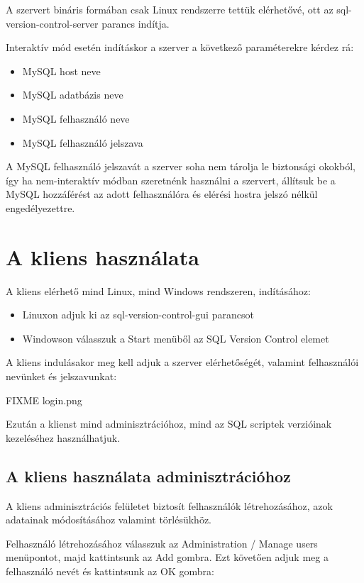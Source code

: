 \documentclass[a4paper,12pt]{article}
\begin{document}
A szervert bináris formában csak Linux rendszerre tettük elérhetővé, ott az
sql-version-control-server parancs indítja.

Interaktív mód esetén indításkor a szerver a következő paraméterekre kérdez rá:

\begin{itemize}
\item MySQL host neve
\item MySQL adatbázis neve
\item MySQL felhasználó neve
\item MySQL felhasználó jelszava
\end{itemize}

A MySQL felhasználó jelszavát a szerver soha nem tárolja le biztonsági okokból,
így ha nem-interaktív módban szeretnénk használni a szervert, állítsuk be a
MySQL hozzáférést az adott felhasználóra és elérési hostra jelszó nélkül
engedélyezettre.

\section{A kliens használata}

A kliens elérhető mind Linux, mind Windows rendszeren, indításához:

\begin{itemize}
\item Linuxon adjuk ki az sql-version-control-gui parancsot
\item Windowson válasszuk a Start menüből az SQL Version Control elemet
\end{itemize}

A kliens indulásakor meg kell adjuk a szerver elérhetőségét, valamint
felhasználói nevünket és jelszavunkat:

FIXME login.png

Ezután a klienst mind adminisztrációhoz, mind az SQL scriptek verzióinak
kezeléséhez használhatjuk.

\subsection{A kliens használata adminisztrációhoz}

A kliens adminisztrációs felületet biztosít felhasználók létrehozásához, azok
adatainak módosításához valamint törlésükhöz.

Felhasználó létrehozásához válasszuk az Administration / Manage users
menüpontot, majd kattintsunk az Add gombra. Ezt követően adjuk meg a
felhasználó nevét és kattintsunk az OK gombra:
\end{document}
